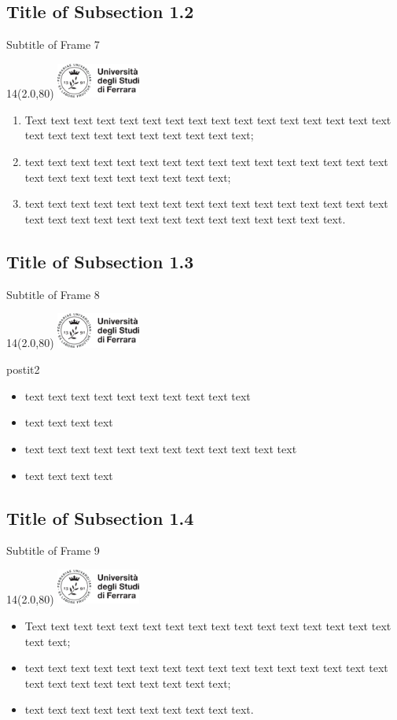 \documentclass[11pt,xcolor={dvipsnames},default]{beamer} %
\newcommand{\MyLogo}{%
\begin{textblock}{14}(2.0,80)
 \includegraphics[height=1.15cm, angle=0]{logo}
\end{textblock}
}
\begin{document}
\subsection{Title of Subsection 1.2}
\begin{frame}{Subtitle of Frame 7}
\MyLogo
\begin{enumerate}
\item<1-> Text text text text text text text text text text text text text text text text text text text text text text text text text text;
\item<2-> text text text text text text text text text text text text text text text text text text text text text text text text text;
\item<3-> text text text text text text text text text text text text text text text text text text text text text text text text text text text text text text.
\end{enumerate}
\end{frame}

\subsection{Title of Subsection 1.3}
\begin{frame}{Subtitle of Frame 8}
\MyLogo
\begin{center}
\end{center}
\pause
\begin{beamercolorbox}[shadow=false, rounded=true]{postit2}
\begin{itemize}
\item text text text text text text text text text text
\item text text text text
\item text text text text text text text text text text text text
\item text text text text
\end{itemize}
\end{beamercolorbox}
\end{frame}

\subsection{Title of Subsection 1.4}
\begin{frame}{Subtitle of Frame 9}
\transdissolve
\MyLogo
\begin{itemize}
\item<1-> Text text text text text text text text text text text text text text text text text text;
\item<2-> text text text text text text text text text text text text text text text text text text text text text text text text text;
\item<3-> text text text text text text text text text text.
\end{itemize}
\end{frame}
\end{document}
